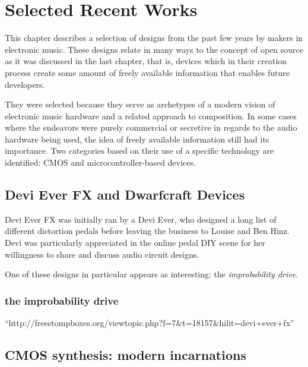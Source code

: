 \chapter{Selected Recent Works}\label{selrecworks}

This chapter describes a selection of designs from the past few years by makers in electronic music. These designs relate in many ways to the concept of open source as it was discussed in the last chapter, that is, devices which in their creation process create some amount of freely available information that enables future developers.

They were selected because they serve as archetypes of a modern vision of electronic music hardware and a related approach to composition. In some cases where the endeavors were purely commercial or secretive in regards to the audio hardware being used, the idea of freely available information still had its importance. Two categories based on their use of a specific technology are identified: CMOS and microcontroller-based devices. 

\section{Devi Ever FX and Dwarfcraft Devices}

Devi Ever FX was initially ran by a Devi Ever, who designed a long list of different distortion pedals before leaving the business to Louise and Ben Hinz. Devi was particularly appreciated in the online pedal DIY scene for her willingness to share and discuss audio circuit designs. 

One of these designs in particular appears as interesting: the \emph{improbability drive}. 

\subsection{the improbability drive}



``http://freestompboxes.org/viewtopic.php?f=7&t=18157&hilit=devi+ever+fx''

\section{CMOS synthesis: modern incarnations}

